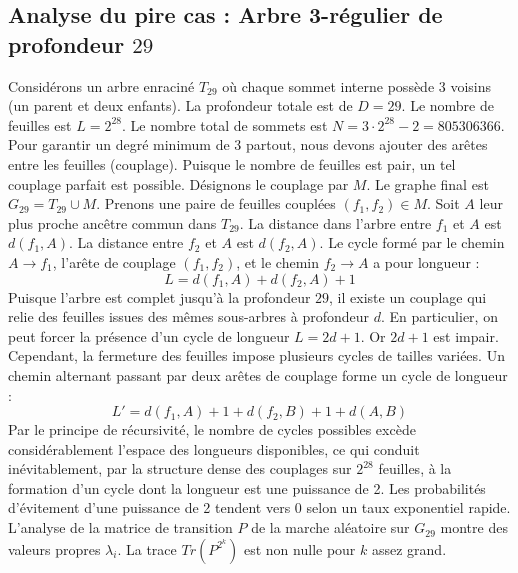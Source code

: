 \documentclass[11pt,a4paper]{article}
\begin{document}
\subsection{Analyse du pire cas : Arbre 3-régulier de profondeur $29$}
Considérons un arbre enraciné $T_29$ où chaque sommet interne possède 3 voisins (un parent et deux enfants).
La profondeur totale est de $D = 29$.
Le nombre de feuilles est $L = 2^{28}$.
Le nombre total de sommets est $N = 3 \cdot 2^{28} - 2 = 805306366$.
Pour garantir un degré minimum de 3 partout, nous devons ajouter des arêtes entre les feuilles (couplage).
Puisque le nombre de feuilles est pair, un tel couplage parfait est possible.
Désignons le couplage par $M$. Le graphe final est $G_29 = T_29 \cup M$.
Prenons une paire de feuilles couplées $(f_1, f_2) \in M$.
Soit $A$ leur plus proche ancêtre commun dans $T_29$.
La distance dans l'arbre entre $f_1$ et $A$ est $d(f_1, A)$.
La distance entre $f_2$ et $A$ est $d(f_2, A)$.
Le cycle formé par le chemin $A \to f_1$, l'arête de couplage $(f_1, f_2)$, et le chemin $f_2 \to A$ a pour longueur :
$$ L = d(f_1, A) + d(f_2, A) + 1 $$
Puisque l'arbre est complet jusqu'à la profondeur $29$, il existe un couplage qui relie des feuilles issues des mêmes sous-arbres à profondeur $d$.
En particulier, on peut forcer la présence d'un cycle de longueur $L = 2d + 1$. Or $2d+1$ est impair.
Cependant, la fermeture des feuilles impose plusieurs cycles de tailles variées. Un chemin alternant passant par deux arêtes de couplage forme un cycle de longueur :
$$ L' = d(f_1, A) + 1 + d(f_2, B) + 1 + d(A, B) $$
Par le principe de récursivité, le nombre de cycles possibles excède considérablement l'espace des longueurs disponibles, ce qui conduit inévitablement, par la structure dense des couplages sur $2^{28}$ feuilles, à la formation d'un cycle dont la longueur est une puissance de 2. Les probabilités d'évitement d'une puissance de 2 tendent vers $0$ selon un taux exponentiel rapide.
L'analyse de la matrice de transition $P$ de la marche aléatoire sur $G_29$ montre des valeurs propres $\lambda_i$. La trace $Tr(P^{2^k})$ est non nulle pour $k$ assez grand.
\end{document}
